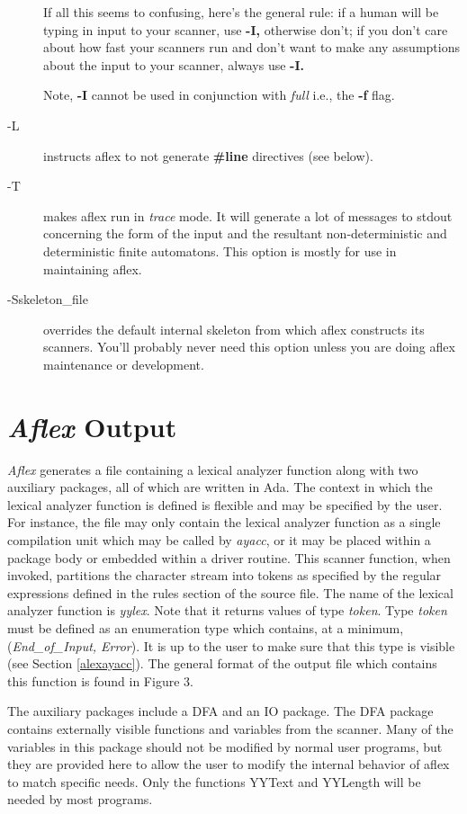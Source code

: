 \begin{description}
If all this seems to confusing, here's the general rule: if a human will
be typing in input to your scanner, use
{\bf -I,}
otherwise don't; if you don't care about how fast your scanners run and
don't want to make any assumptions about the input to your scanner,
always use
{\bf -I.}

Note,
{\bf -I}
cannot be used in conjunction with
{\it full}
i.e., the
{\bf -f}
flag.
\item[-L]
instructs aflex to not generate
{\bf \#line}
directives (see below).
\item[-T]
makes aflex run in
{\it trace}
mode.  It will generate a lot of messages to stdout concerning
the form of the input and the resultant non-deterministic and deterministic
finite automatons.  This option is mostly for use in maintaining aflex.
\item[-Sskeleton\_file]
overrides the default internal skeleton from which aflex constructs
its scanners.  You'll probably never need this option unless you are doing
aflex maintenance or development.
\end{description}
\section{{\sl Aflex} Output}
{\sl Aflex} generates a file containing a lexical analyzer function along
with two auxiliary packages, all of which are written in Ada.  
The context in which the lexical analyzer function is defined is flexible 
and may be specified by the user.  For instance,  the file may only 
contain the lexical analyzer function as a single compilation unit which 
may be called by {\sl ayacc},  
or it may be placed within a package body or embedded within a driver 
routine.  This scanner function, when invoked, partitions the character stream 
into tokens as specified by the regular expressions defined in the rules 
section of the source file.  The name of the lexical analyzer 
function is {\sl yylex}. Note that it returns values of type {\it token}.  
Type {\it token} must be defined as an enumeration type which contains, 
at a minimum, ({\it End\_of\_Input, Error}). It is up to the user to make 
sure that this type is visible (see Section \ref{alexayacc}). The general 
format of the output file which contains this function is found in
Figure 3.

\mysk
The auxiliary packages include a DFA and an IO package.  The DFA
package contains externally visible functions and variables from the
scanner.  Many of the variables in this package should not be modified
by normal user programs, but they are provided here to allow the user to
modify the internal behavior of aflex to match specific needs.  Only
the functions YYText and YYLength will be needed by most programs.

